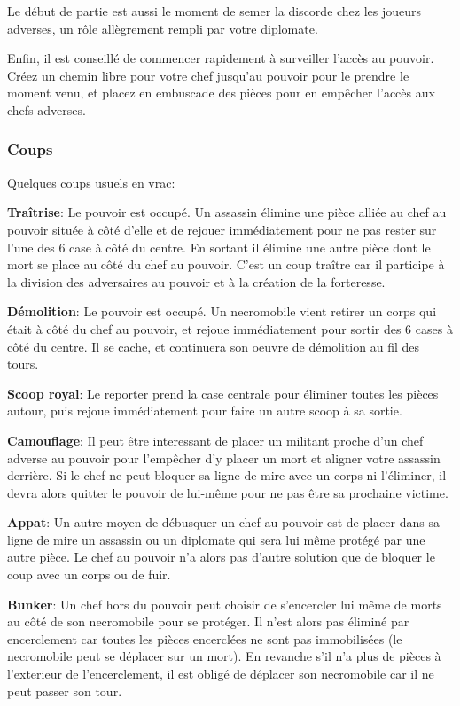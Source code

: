\documentclass{article}
\begin{document}
Le début de partie est aussi le moment de semer la discorde chez les joueurs adverses, un rôle allègrement rempli par votre diplomate.

Enfin, il est conseillé de commencer rapidement à surveiller l'accès au pouvoir. Créez un chemin libre pour votre chef jusqu'au pouvoir pour le prendre le moment venu, et placez en embuscade
des pièces pour en empêcher l'accès aux chefs adverses.

\subsubsection{Coups}
Quelques coups usuels en vrac: 
\vspace{5pt} %

\textbf{Traîtrise}: Le pouvoir est occupé. Un assassin élimine une pièce alliée au chef au pouvoir située à côté d'elle et de rejouer immédiatement pour ne pas rester sur l'une des 6 case à côté du centre.
En sortant il élimine une autre pièce dont le mort se place au côté du chef au pouvoir.
C'est un coup traître car il participe à la division des adversaires au pouvoir et à la création de la forteresse.


\textbf{Démolition}: Le pouvoir est occupé. Un necromobile vient retirer un corps qui était à côté du chef au pouvoir, et rejoue immédiatement pour sortir des 6 cases à côté du centre.
Il se cache, et continuera son oeuvre de démolition au fil des tours.

\textbf{Scoop royal}: Le reporter prend la case centrale pour éliminer toutes les pièces autour, puis rejoue immédiatement pour faire un autre scoop à sa sortie.

\textbf{Camouflage}: Il peut être interessant de placer un militant proche d'un chef adverse au pouvoir pour l'empêcher d'y placer un mort et aligner votre assassin derrière. 
Si le chef ne peut bloquer sa ligne de mire avec un corps ni l'éliminer, 
il devra alors quitter le pouvoir de lui-même pour ne pas être sa prochaine victime.

\textbf{Appat}: Un autre moyen de débusquer un chef au pouvoir est de placer dans sa ligne de mire un assassin ou un diplomate qui sera lui même protégé par une autre pièce.
Le chef au pouvoir n'a alors pas d'autre solution que de bloquer le coup avec un corps ou de fuir.

\textbf{Bunker}: Un chef hors du pouvoir peut choisir de s'encercler lui même de morts au côté de son necromobile pour se protéger.
Il n'est alors pas éliminé par encerclement car toutes les pièces encerclées ne sont pas immobilisées (le necromobile peut se déplacer sur un mort).
En revanche s'il n'a plus de pièces à l'exterieur de l'encerclement, il est obligé de déplacer son necromobile car il ne peut passer son tour.
\end{document}
